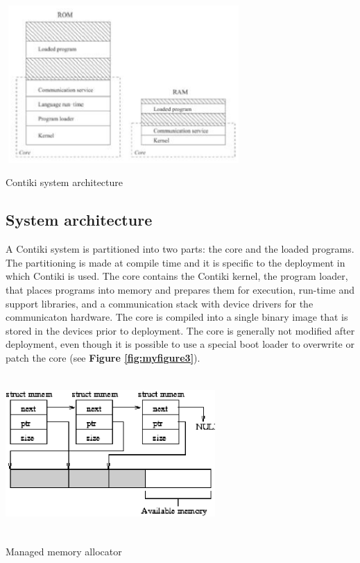 \documentclass[a4paper,10pt]{article}
\makeatletter
\newenvironment{figurehere}{\def\@captype{figure}\vspace{2ex}}{\vspace{2ex}}
\makeatother
\begin{document}
\begin{multicols}{2}
\begin{figurehere}
 \centering
 \includegraphics[width=9cm, height=6cm]{./eps/system.eps}
 \caption{Contiki system architecture}
 \label{fig:myfigure3}
\end{figurehere}


\subsection{System architecture}
A Contiki system is partitioned into two parts: the core and the loaded programs. 
The partitioning is made at compile time and it is speciﬁc to the deployment in which Contiki is used.
The core contains the Contiki kernel, the program loader, that places programs into
 memory and prepares them for execution, run-time and support libraries, and a
 communication stack with device drivers for the communicaton hardware.
The core is compiled into a single binary image that is stored in the devices prior to
 deployment. The core is generally not modiﬁed after deployment, even though it is 
possible to use a special boot loader to overwrite or patch the core (see {\bf Figure \ref{fig:myfigure3}}).


\begin{figurehere}
 \centering
 \includegraphics[width=8cm, height=6cm]{./eps/mmem.eps}
 \caption{Managed memory allocator}
 \label{fig:myMmem}
\end{figurehere}


\end{multicols}
\end{document}

